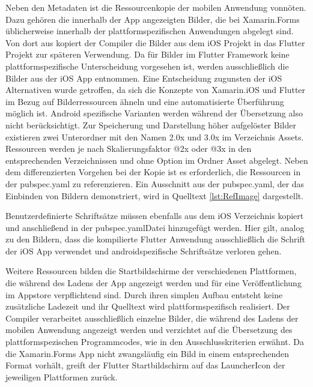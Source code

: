 Neben den Metadaten ist die Ressourcenkopie der mobilen Anwendung vonnöten.  Dazu gehören die innerhalb der App angezeigten Bilder, die bei Xamarin.Forms üblicherweise innerhalb der plattformspezifischen Anwendungen abgelegt sind. Von dort aus kopiert der Compiler die Bilder aus dem iOS Projekt in das Flutter Projekt zur späteren Verwendung.  Da für Bilder im Flutter Framework keine plattformspezifische Unterscheidung vorgesehen ist,  werden ausschließlich die Bilder aus der iOS App entnommen.  Eine Entscheidung zugunsten der iOS Alternativen wurde  getroffen,  da sich die Konzepte von Xamarin.iOS und Flutter im Bezug auf Bilderressourcen ähneln und eine automatisierte Überführung möglich ist.  Android spezifische Varianten werden während der Übersetzung also nicht berücksichtigt.   
Zur Speicherung und Darstellung höher aufgelöster Bilder existieren zwei Unterordner mit den Namen  \glq 2.0x\grq{} und  \glq 3.0x\grq{} im Verzeichnis Assets.  Ressourcen werden je nach Skalierungsfaktor  \glq @2x\grq{} oder  \glq @3x\grq{} in den entsprechenden Verzeichnissen und ohne Option im Ordner Asset abgelegt.
Neben dem differenzierten Vorgehen bei der Kopie ist es erforderlich,  die Ressourcen in der \glq pubspec.yaml\grq{} zu referenzieren.  Ein Ausschnitt aus der \glq pubspec.yaml\grq ,  der das Einbinden von Bildern demonstriert,  wird in Quelltext \ref{lst:RefImage} dargestellt.

 


Benutzerdefinierte Schriftsätze müssen ebenfalls aus dem iOS Verzeichnis kopiert und anschließend in der \glq pubspec.yaml\grq Datei hinzugefügt werden.  Hier gilt,  analog zu den Bildern,  dass die kompilierte Flutter Anwendung ausschließlich die Schrift der iOS App verwendet und androidspezifische Schriftsätze verloren gehen.

Weitere Ressourcen bilden die Startbildschirme der verschiedenen Plattformen,  die während des Ladens der App angezeigt werden und für eine Veröffentlichung im Appstore verpflichtend sind.  Durch ihren simplen Aufbau entsteht keine zusätzliche Ladezeit und ihr Quelltext wird plattformspezifisch realisiert.  Der Compiler verarbeitet ausschließlich einzelne Bilder, die während des Ladens der mobilen Anwendung angezeigt werden und verzichtet auf die Übersetzung des plattformspezischen Programmcodes,  wie in den Ausschlusskriterien erwähnt.  Da die Xamarin.Forms App nicht zwangsläufig ein Bild in einem entsprechenden Format vorhält,  greift der Flutter Startbildschirm auf das LauncherIcon der jeweiligen Plattformen zurück.  

